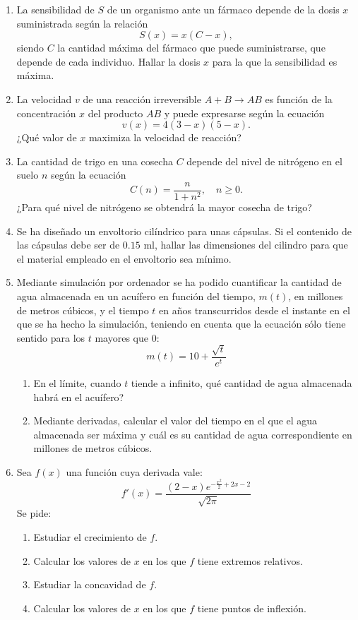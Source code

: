 \documentclass[a4paper,titlepage]{article}
\theoremstyle{solution}
\begin{document}
\begin{enumerate}[leftmargin=*]
\item La sensibilidad de $S$ de un organismo ante un fármaco depende de la dosis $x$ suministrada según la relación
\[
S(x) = x(C-x),
\]
siendo $C$ la cantidad máxima del fármaco que puede suministrarse, que depende de cada individuo. 
Hallar la dosis $x$ para la que la sensibilidad es máxima.

\item La velocidad $v$ de una reacción irreversible $A+B\rightarrow AB$ es función de la concentración $x$ del producto $AB$ y puede expresarse según la ecuación
\[
v(x) = 4(3-x)(5-x).
\]
¿Qué valor de $x$ maximiza la velocidad de reacción?

\item La cantidad de trigo en una cosecha $C$ depende del nivel de nitrógeno en el suelo $n$ según la ecuación
\[
C(n) = \frac{n}{1+n^2},\quad n\geq 0. 
\]
¿Para qué nivel de nitrógeno se obtendrá la mayor cosecha de trigo?

\item Se ha diseñado un envoltorio cilíndrico para unas cápsulas. Si el contenido de las cápsulas debe ser de $0.15$ ml, hallar las dimensiones del cilindro para que el material empleado en el envoltorio sea mínimo.

\item Mediante simulación por ordenador se ha podido cuantificar la cantidad de agua almacenada en un acuífero en función del tiempo, $m(t)$, en millones de metros cúbicos, y el tiempo $t$ en años transcurridos desde el instante en el que se ha hecho la simulación, teniendo en cuenta que la ecuación sólo tiene sentido para los $t$ mayores que 0:
\[
m(t) = 10 + \frac{{\sqrt t }} {{e^t }}
\]
\begin{enumerate}
\item En el límite, cuando $t$ tiende a infinito, qué cantidad de agua almacenada habrá en el acuífero?
\item Mediante derivadas, calcular el valor del tiempo en el que el agua almacenada ser máxima y cuál es su cantidad de agua correspondiente en millones de metros cúbicos.
\end{enumerate}

\item Sea $f(x)$ una función cuya derivada vale:
\[
f'(x) = \frac{(2-x) e^{-\frac{x^2}{2}+2x-2}}{\sqrt{2\pi}}
\]
Se pide:
\begin{enumerate}
\item Estudiar el crecimiento de $f$.
\item Calcular los valores de $x$ en los que $f$ tiene extremos relativos.
\item Estudiar la concavidad de $f$.
\item Calcular los valores de $x$ en los que $f$ tiene puntos de inflexión.
\end{enumerate}


\end{enumerate}
\end{document}
